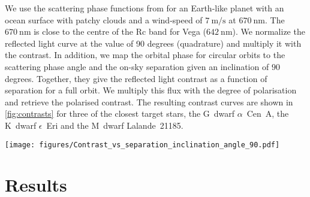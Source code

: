 \documentclass[
    usenatbib,
]{mnras}
\newcommand{\todo}[1]{\textcolor{red}{[#1]}}
\newcommand{\timmy}[1]{\textcolor{red}{[\textbf{Timmy:} #1]}} %
\newcommand{\IWA}{\ensuremath{\mathrm{IWA}}}
\newcommand{\hwo}{HabWorlds}
\begin{document}
We use the scattering phase functions from \cite{treesandstam2019} for an Earth-like planet with an ocean surface with patchy clouds and a wind-speed of $\SI{7}{\meter\per\second}$ at $\SI{670}{\nano\meter}$.
%
The $\SI{670}{\nano\meter}$ is close to the centre of the Rc band for Vega ($\SI{642}{\nano\meter}$). 
%
We normalize the reflected light curve at the value of 90 degrees (quadrature) and multiply it with the contrast.
%
In addition, we map the orbital phase for circular orbits to the scattering phase angle and the on-sky separation given an inclination of $90$ degrees.
%
Together, they give the reflected light contrast as a function of separation for a full orbit.
%
We multiply this flux with the degree of polarisation and retrieve the polarised contrast.
%
The resulting contrast curves are shown in \cref{fig:contrasts} for three of the closest target stars, the G~dwarf $\alpha$~Cen~A, the K~dwarf $\epsilon$~Eri and the M~dwarf Lalande~21185.

\begin{figure*}%
   \centering
   \texttt{[image: figures/Contrast\_vs\_separation\_inclination\_angle\_90.pdf]}
   \caption{
    The reflected light contrast and orbital separation of an Earth-like planet with an ocean surface and patchy clouds over a planetary orbit assuming an orbital inclination of $90^\circ$ for the stars $\alpha$ Cen A, $\epsilon$ Eri and Lalande 21185. The solid line indicates the contrast in unpolarised light with the contrast at quadrature marked by a solid dot. The polarised component is indicated by the colored dots for which the color represents the scattering phase angle from quadrature. The light grey points show the quadrature contrasts of the other targets in the star list and the dashed lines indicate $1,2$ and $3$ times the \IWA\ for \hwo.
    }
    \label{fig:contrasts}
\end{figure*}


\section{Results}

\end{document}
